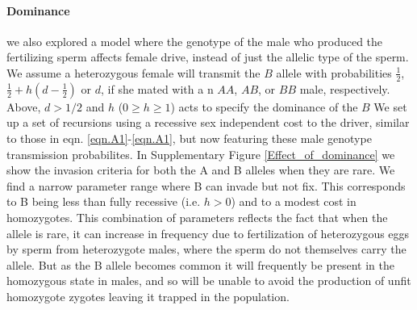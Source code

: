 \documentclass[12pt,letterpaper]{article}
\begin{document}
\paragraph{Dominance} we also explored a model where
the genotype of the male who produced the fertilizing sperm affects female drive,
instead of just the allelic type of the sperm.
 We assume a heterozygous female will transmit the $B$ allele 
  with probabilities  $\frac{1}{2}$,  $\frac{1}{2} + h(d-\frac{1}{2}) $ or $d$, 
 if she mated with a n $AA$, $AB$, or $BB$ male,  respectively.
 Above, $d > 1/2$ and $h$ ($0 \geq h \geq 1$) acts to specify the dominance of the $B$
We set up a set of recursions using a recessive sex independent cost to
the driver, similar to those in eqn.
\ref{eqn.A1}-\ref{eqn.A1}, but now featuring these male genotype
transmission probabilites. In Supplementary Figure \ref{Effect_of_dominance} we show the invasion
criteria for both the A and B alleles when they are rare. 
We find a narrow parameter range where B 
can invade but not fix.
This corresponds to B being less than fully recessive (i.e. $h>0$) and to a modest cost in homozygotes. 
This combination of parameters reflects the fact that when the allele is rare, 
it can increase in frequency due to fertilization of heterozygous eggs
by sperm from heterozygote males, where the sperm do not themselves
carry the allele. But as the B allele becomes common it will frequently be
present in the homozygous state in males, and so will be unable to
avoid the production of unfit homozygote zygotes leaving it trapped in
the population. 
\end{document}
